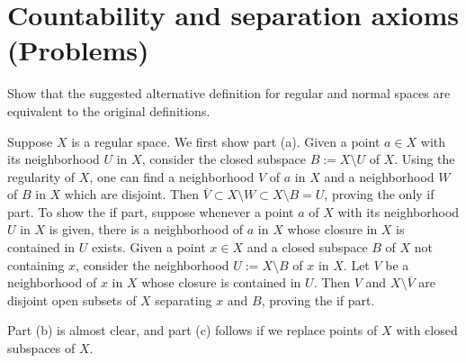 \section{Countability and separation axioms (Problems)}

\begin{prob}
    Show that the suggested alternative definition for regular and normal spaces are equivalent to the original definitions.
\end{prob}
\begin{sol}
    Suppose $X$ is a regular space.
    We first show part (a).
    Given a point $a\in X$ with its neighborhood $U$ in $X$, consider the closed subspace $B:=X\setminus U$ of $X$.
    Using the regularity of $X$, one can find a neighborhood $V$ of $a$ in $X$ and a neighborhood $W$ of $B$ in $X$ which are disjoint.
    Then $\overline{V}\subset X\setminus W\subset X\setminus B=U$, proving the only if part.
    To show the if part, suppose whenever a point $a$ of $X$ with its neighborhood $U$ in $X$ is given, there is a neighborhood of $a$ in $X$ whose closure in $X$ is contained in $U$ exists.
    Given a point $x\in X$ and a closed subspace $B$ of $X$ not containing $x$, consider the neighborhood $U:=X\setminus B$ of $x$ in $X$.
    Let $V$ be a neighborhood of $x$ in $X$ whose closure is contained in $U$.
    Then $V$ and $X\setminus\overline{V}$ are disjoint open subsets of $X$ separating $x$ and $B$, proving the if part.

    Part (b) is almost clear, and part (c) follows if we replace points of $X$ with closed subspaces of $X$.
\end{sol}

\color{red}
\begin{prob}
    
\end{prob}
\begin{sol}
    
\end{sol}
\color{black}

